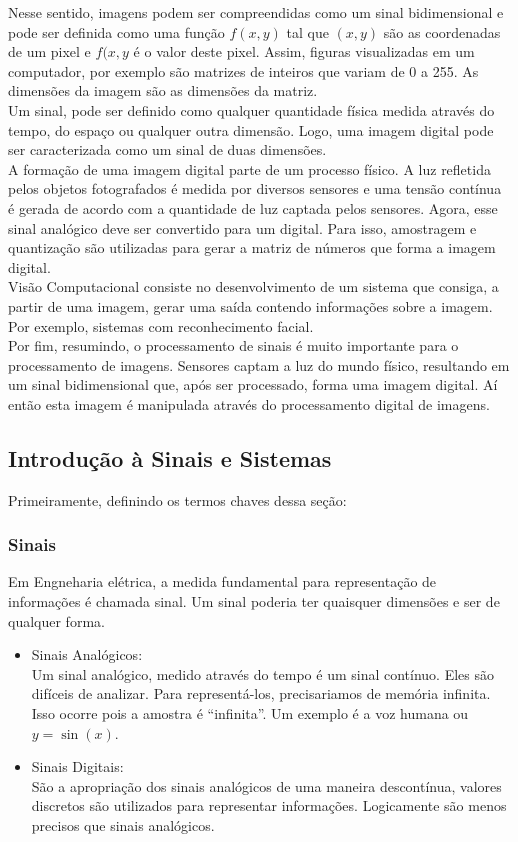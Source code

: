 \documentclass[a4paper, 12pt]{article}
\begin{document}
Nesse sentido, imagens podem ser compreendidas como um sinal bidimensional e pode ser definida como uma função \(f(x,y)\) tal que \((x,y)\) são as coordenadas de um pixel e \(f(x,y\) é o valor deste pixel. Assim, figuras visualizadas em um computador, por exemplo são matrizes de inteiros que variam de 0 a 255. As dimensões da imagem são as dimensões da matriz.
\\

Um sinal, pode ser definido como qualquer quantidade física medida através do tempo, do espaço ou qualquer outra dimensão. Logo, uma imagem digital pode ser caracterizada como um sinal de duas dimensões.
\\

A formação de uma imagem digital parte de um processo físico. A luz refletida pelos objetos fotografados é medida por diversos sensores e uma tensão contínua é gerada de acordo com a quantidade de luz captada pelos sensores. Agora, esse sinal analógico deve ser convertido para um digital. Para isso, amostragem e quantização são utilizadas para gerar a matriz de números que forma a imagem digital.
\\

Visão Computacional consiste no desenvolvimento de um sistema que consiga, a partir de uma imagem, gerar uma saída contendo informações sobre a imagem. Por exemplo, sistemas com reconhecimento facial.
\\

Por fim, resumindo, o processamento de sinais é muito importante para
o processamento de imagens. Sensores captam a luz do mundo físico, resultando em um sinal bidimensional que, após ser processado, forma uma imagem digital. Aí então esta imagem é manipulada através do processamento digital de imagens.

\subsection{Introdução à Sinais e Sistemas}
Primeiramente, definindo os termos chaves dessa seção:
\subsubsection{Sinais}
Em Engneharia elétrica, a medida fundamental para representação
de informações é chamada sinal. Um sinal poderia ter quaisquer dimensões
e ser de qualquer forma.
\begin{itemize}
	\item Sinais Analógicos:
    \\
	Um sinal analógico, medido através do tempo é um sinal contínuo.
	Eles são difíceis de analizar. Para representá-los, precisariamos de memória infinita.
	Isso ocorre pois a amostra é ``infinita''. Um exemplo é a voz humana ou $y = \sin(x)$.
	\item Sinais Digitais:
	\\
	São a apropriação dos sinais analógicos de uma maneira descontínua, valores discretos
	são utilizados para representar informações. Logicamente são menos precisos que sinais
	analógicos.
\end{itemize}
\end{document}
